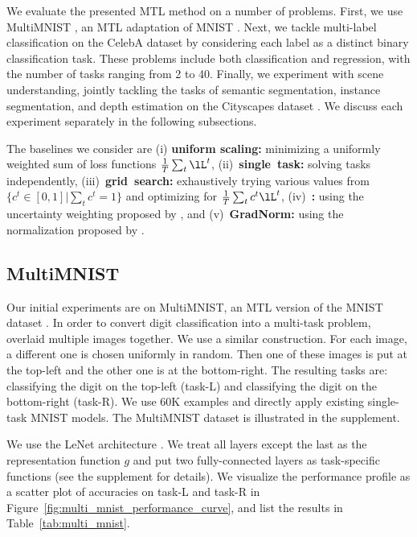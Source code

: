 
We evaluate the presented MTL method on a number of problems. First, we use MultiMNIST \citep{multi_mnist}, an MTL adaptation of MNIST \citep{mnist}. Next, we tackle multi-label classification on the CelebA dataset \citep{celeba} by considering each label as a distinct binary classification task. These problems include both classification and regression, with the number of tasks ranging from 2 to 40. Finally, we experiment with scene understanding, jointly tackling the tasks of semantic segmentation, instance segmentation, and depth estimation on the Cityscapes dataset \citep{cityscapes}. We discuss each experiment separately in the following subsections.

The baselines we consider are (i) \textbf{uniform scaling:} minimizing a uniformly weighted sum of loss functions \mbox{$\frac{1}{T}\sum_t \lL^t$}, \mbox{(ii) \textbf{single task:}} solving tasks independently, \mbox{(iii) \textbf{grid search:}} exhaustively trying various values from $\{ c^t \in [0,1] | \sum_t c^t = 1\}$ and optimizing for $\frac{1}{T}\sum_t c^t \lL^t$, \mbox{(iv) \textbf{\citet{Kendall2018}:}} using the uncertainty weighting proposed by \citet{Kendall2018}, and \mbox{(v) \textbf{GradNorm:}} using the normalization proposed by \citet{Chen2018}.



\subsection{MultiMNIST}
\label{sec:multi_mnist_exp}

Our initial experiments are on MultiMNIST, an MTL version of the MNIST dataset \citep{multi_mnist}. In order to convert digit classification into a multi-task problem, \citet{multi_mnist} overlaid multiple images together. We use a similar construction. For each image, a different one is chosen uniformly in random. Then one of these images is put at the top-left and the other one is at the bottom-right. The resulting tasks are: classifying the digit on the top-left (task-L) and classifying the digit on the bottom-right (task-R). We use 60K examples and directly apply existing single-task MNIST models. The MultiMNIST dataset is illustrated in the supplement.

We use the LeNet architecture \citep{mnist}. We treat all layers except the last as the representation function $g$ and put two fully-connected layers as task-specific functions (see the supplement for details). We visualize the performance profile as a scatter plot of accuracies on task-L and task-R in Figure~\ref{fig:multi_mnist_performance_curve}, and list the results in Table~\ref{tab:multi_mnist}.

